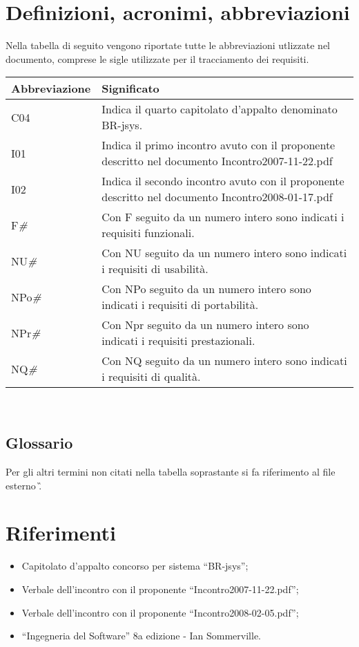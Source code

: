 \section{Definizioni, acronimi, abbreviazioni}
Nella tabella di seguito vengono riportate tutte le abbreviazioni utlizzate nel documento, comprese le sigle utilizzate per il tracciamento dei requisiti.
\begin{center}
\begin{tabular}{||p{3.0cm}||p{8.5cm}||} \hline
\textbf{Abbreviazione} & \textbf{Significato} \\ \hline
C04 & Indica il quarto capitolato d'appalto denominato BR-jsys.\\ \hline
I01 & Indica il primo incontro avuto con il proponente descritto nel documento Incontro2007-11-22.pdf\\ \hline
I02 & Indica il secondo incontro avuto con il proponente descritto nel documento Incontro2008-01-17.pdf\\ \hline
F\textit{\#} & Con F seguito da un numero intero sono indicati i requisiti funzionali.\\ \hline
NU\textit{\#} & Con NU seguito da un numero intero sono indicati i requisiti di usabilit\`a.\\ \hline
NPo\textit{\#} & Con NPo seguito da un numero intero sono indicati i requisiti di portabilit\`a.\\ \hline
NPr\textit{\#} & Con Npr seguito da un numero intero sono indicati i requisiti prestazionali.\\ \hline
NQ\textit{\#} & Con NQ seguito da un numero intero sono indicati i requisiti di qualit\`a.\\ \hline

\end{tabular} \\
\end{center}
\subsection{Glossario}
Per gli altri termini non citati nella tabella soprastante si fa riferimento al file esterno \G.
\section{Riferimenti}
\begin{itemize}
\item Capitolato d'appalto concorso per sistema ``BR-jsys'';
\item Verbale dell'incontro con il proponente ``Incontro2007-11-22.pdf'';
\item Verbale dell'incontro con il proponente ``Incontro2008-02-05.pdf'';
\item ``Ingegneria del Software'' 8a edizione - Ian Sommerville.
\end{itemize}
